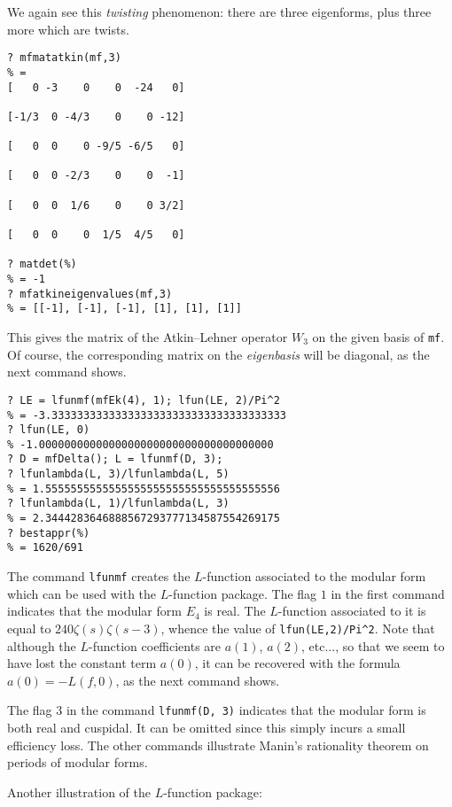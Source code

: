 \documentclass[11pt]{article}
\newcommand{\z}{\zeta}
\def\kbd#1{{\tt #1}}
\begin{document}
We again see this \emph{twisting} phenomenon: there are three eigenforms,
plus three more which are twists.

\begin{verbatim}
? mfmatatkin(mf,3)
% =
[   0 -3    0    0  -24   0]

[-1/3  0 -4/3    0    0 -12]

[   0  0    0 -9/5 -6/5   0]

[   0  0 -2/3    0    0  -1]

[   0  0  1/6    0    0 3/2]

[   0  0    0  1/5  4/5   0]

? matdet(%)
% = -1
? mfatkineigenvalues(mf,3)
% = [[-1], [-1], [-1], [1], [1], [1]]
\end{verbatim}

This gives the matrix of the Atkin--Lehner operator $W_3$ on the given
basis of \kbd{mf}. Of course, the corresponding matrix on the \emph{eigenbasis}
will be diagonal, as the next command shows.

\medskip

\begin{verbatim}
? LE = lfunmf(mfEk(4), 1); lfun(LE, 2)/Pi^2
% = -3.3333333333333333333333333333333333333
? lfun(LE, 0)
% -1.0000000000000000000000000000000000000
? D = mfDelta(); L = lfunmf(D, 3);
? lfunlambda(L, 3)/lfunlambda(L, 5)
% = 1.5555555555555555555555555555555555556
? lfunlambda(L, 1)/lfunlambda(L, 3)
% = 2.3444283646888567293777134587554269175
? bestappr(%)
% = 1620/691
\end{verbatim}

The command \kbd{lfunmf} creates the $L$-function associated to the
modular form which can be used with the $L$-function package.
The flag $1$ in the first command indicates that the modular form $E_4$ is
real. The $L$-function associated to it is equal to $240\z(s)\z(s-3)$,
whence the value of {\tt lfun(LE,2)/Pi\^{}2}. Note that although the
$L$-function coefficients are $a(1)$, $a(2)$, etc..., so that we seem to have
lost the constant term $a(0)$, it can be recovered with the formula
$a(0)=-L(f,0)$, as the next command shows.

The flag $3$ in the command \kbd{lfunmf(D, 3)} indicates that the
modular form is both real and cuspidal. It can be omitted since this simply
incurs a small efficiency loss. The other commands illustrate Manin's
rationality theorem on periods of modular forms.

Another illustration of the $L$-function package:
\end{document}
